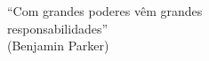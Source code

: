 \begin{epigrafe}
    \vspace*{\fill}
	\begin{flushright}
		``Com grandes poderes vêm grandes\\
		responsabilidades''\\
		(Benjamin Parker)
	\end{flushright}
\end{epigrafe}